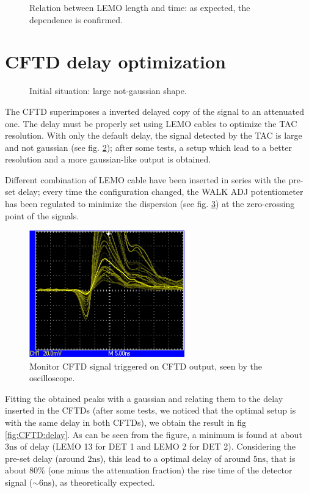 \documentclass[11pt,a4 paper]{article}
\begin{document}
\begin{figure}[H]
    \centering
    \caption{Relation between LEMO length and time: as expected, the dependence is confirmed.}
    \label{fig:lemo_length}
\end{figure}

\section{CFTD delay optimization}

\begin{figure}[H]
    \centering
    \caption{Initial situation: large not-gaussian shape.}
    \label{fig:delay:bad}
\end{figure}

The CFTD superimposes a inverted delayed copy of the signal to an attenuated one. The delay must be properly set using LEMO cables to optimize the TAC resolution. With only the default delay, the signal detected by the TAC is large and not gaussian (see fig. \ref{fig:delay:bad}); after some tests, a setup which lead to a better resolution and a more gaussian-like output is obtained.

Different combination of LEMO cable have been inserted in series with the pre-set delay; every time the configuration changed, the WALK ADJ potentiometer has been regulated to minimize the dispersion (see fig. \ref{fig:oscilloscope}) at the zero-crossing point of the signals.
\begin{figure}[H]
    \centering
    \includegraphics[width=0.6\textwidth]{img/oscilloscope.jpg}
    \caption{Monitor CFTD signal triggered on CFTD output, seen by the oscilloscope.}
    \label{fig:oscilloscope}
\end{figure}

Fitting the obtained peaks with a gaussian and relating them to the delay inserted in the CFTDs (after some tests, we noticed that the optimal setup is with the same delay in both CFTDs), we obtain the result in fig \ref{fig:CFTD:delay}. As can be seen from the figure, a minimum is found at about $3\si{\nano\second}$ of delay (LEMO 13 for DET 1 and LEMO 2 for DET 2). Considering the pre-set delay (around $2\si{\nano\second}$), this lead to a optimal delay of around $5\si{\nano\second}$, that is about $80\%$ (one minus the attenuation fraction) the rise time of the detector signal ($\sim6\si{\nano\second}$), as  theoretically expected.
\end{document}
